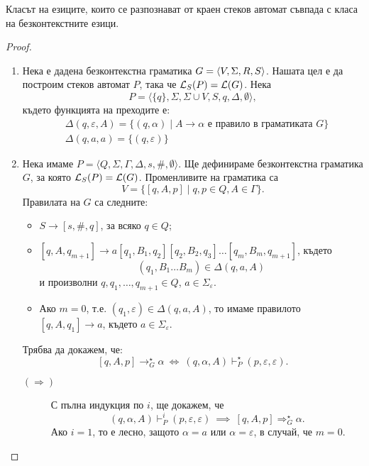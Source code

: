\begin{framed}
\begin{thm}
  Класът на езиците, които се разпознават от краен стеков автомат съвпада с
  класа на безконтекстните езици.
\end{thm}
\end{framed}
\begin{proof}
  \begin{enumerate}[1)]
  \item 
    Нека е дадена безконтекстна граматика $G = \langle{V,\Sigma,R,S}\rangle$.
    Нашата цел е да построим стеков автомат $P$, така че $\mathcal{L}_S(P) = \mathcal{L}(G)$.
    Нека  \[P = \langle{\{q\},\Sigma,\Sigma\cup V,S,q,\Delta,\emptyset}\rangle,\]
    където функцията на преходите е:
    \begin{align*}
      & \Delta(q,\varepsilon,A) = \{(q,\alpha)\mid A\to\alpha\mbox{ е правило в граматиката }G\}\\
      & \Delta(q,a,a) = \{(q,\varepsilon)\}
    \end{align*}
  \item
    Нека имаме $P = \langle{Q, \Sigma, \Gamma, \Delta, s, \#, \emptyset}\rangle$.
    Ще дефинираме безконтекстна граматика $G$, за която $\mathcal{L}_S(P) = \mathcal{L}(G)$.
    Променливите на граматика са 
    \[V = \{[q,A,p] \mid q,p \in Q, A \in \Gamma\}.\]
    Правилата на $G$ са следните:
    \begin{itemize}
    \item
      $S \to [s,\#,q]$, за всяко $q \in Q$;
    \item
      $[q,A,q_{m+1}] \to a[q_1,B_1,q_2][q_2,B_2,q_3]\dots [q_m,B_m,q_{m+1}]$,
      където 
      \[(q_1,B_1\dots B_m) \in \Delta(q, a, A)\]
      и произволни $q,q_1,\dots,q_{m+1} \in Q$,
      $a \in \Sigma_\varepsilon$.
    \item
      Ако $m = 0$, т.е. $(q_1,\varepsilon) \in \Delta(q, a, A)$,  то имаме правилото $[q,A,q_{1}] \to a$, където $a \in \Sigma_\varepsilon$.
    \end{itemize}
    Трябва да докажем, че:
    \[[q,A,p] \rightarrow^\star_G \alpha\ \iff\ (q,\alpha,A) \vdash^\star_P (p,\varepsilon,\varepsilon).\]
    \begin{description}
    \item[$(\Rightarrow)$]
      С пълна индукция по $i$, ще докажем, че 
      \[(q,\alpha,A) \vdash^i_P (p,\varepsilon,\varepsilon)\ \implies\ [q,A,p] \Rightarrow^\star_G \alpha.\]
      Ако $i = 1$, то е лесно, защото $\alpha = a$ или $\alpha = \varepsilon$, в случай, че $m = 0$.

\end{description}
\end{enumerate}
\end{proof}
